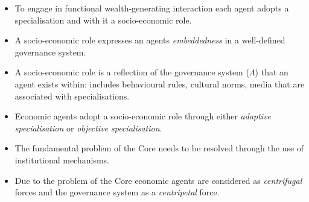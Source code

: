 \documentclass[9pt]{beamer}
\begin{document}
\begin{frame} %
\begin{itemize}
\item To engage in functional wealth-generating interaction each agent adopts a specialisation and with it a socio-economic role.
\medskip
\item A socio-economic role expresses an agents \emph{embeddedness} in a well-defined governance system.
\medskip
\begin{figure}[h]
\begin{center}
\end{center}
\end{figure}
\medskip
\item A socio-economic role is a reflection of the governance system ($\Lambda$) that an agent exists within: includes behavioural rules, cultural norms, media that are associated with specialisations.
\medskip
\item Economic agents adopt a socio-economic role through either \emph{adaptive specialisation} or \emph{objective specialisation}.
\end{itemize}
\end{frame}


\begin{frame} %
\begin{itemize}
\item The fundamental problem of the Core needs to be resolved through the use of institutional mechanisms.
\end{itemize}
\medskip
\begin{figure}[h]
\begin{center}
\end{center}
\end{figure}
\begin{itemize}
\medskip
\item Due to the problem of the Core economic agents are considered as \emph{centrifugal} forces and the governance system as a \emph{centripetal} force.
\end{itemize}
\end{frame}
\end{document}
